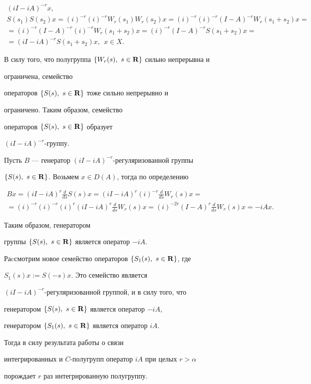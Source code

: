 \begin{pf}
\begin{gather*}
(iI-iA)^{-r}x, \\


%


S(s_1)S(s_2)x=(i)^{-r}(i)^{-r}W_r(s_1)W_r(s_2)x=(i)^{-r}(i)^{-r}


(I-A)^{-r}W_r(s_1+s_2)x= \\


%


=(i)^{-r}(I-A)^{-r}(i)^{-r}W_r(s_1+s_2)x=


(i)^{-r}(I-A)^{-r}S(s_1+s_2)x= \\


%


=(iI-iA)^{-r}S(s_1+s_2)x,\ \ x\in X.


\end{gather*} 


В силу того, что полугруппа $\{W_r(s),\ s\in \bold R\}$ сильно непрерывна и


ограничена, семейство 


операторов $\{S(s),\ s\in \bold R\}$ тоже сильно непрерывно и


ограничено. Таким образом, семейство 


операторов $\{S(s),\ s\in \bold R\}$ образует


$(iI-iA)^{-r}$-группу. 


Пусть $B$ --- генератор $(iI-iA)^{-r}$-регуляризованной группы 


$\{S(s),\ s\in \bold R\}$. Возьмем $x\in D(A)$, тогда по определению


\begin{multline*}


Bx=(iI-iA)^r\frac{d}{ds}S(s)x=(iI-iA)^r(i)^{-r}\frac{d}{ds}W_r(s)x= \\


%


=(i)^{-r}(i)^{-r}(i)^r(iI-iA)^r\frac{d}{ds}W_r(s)x=


(i)^{-2r}(I-A)^r\frac{d}{ds}W_r(s)x=-iAx.


\end{multline*}


Таким образом, генератором 


группы $\{S(s),\ s\in \bold R\}$ является оператор $-iA$.





Раcсмотрим новое семейство операторов $\{S_1(s),\ s\in \bold R\}$, где 


$S_1(s)x:=S(-s)x$. Это семейство является


$(iI-iA)^{-r}$-регуляризованной группой, и в силу того, что


генератором $\{S(s),\ s\in \bold R\}$ является оператор $-iA$,


генератором $\{S_1(s),\ s\in \bold R\}$ является оператор $iA$.


Тогда в силу результата работы \cite{Tanaka} о связи


интегрированных и $C$-полугрупп оператор $iA$ при целых $r>\alpha$ 


порождает $r$ раз интегрированную полугруппу.


\end{pf}





